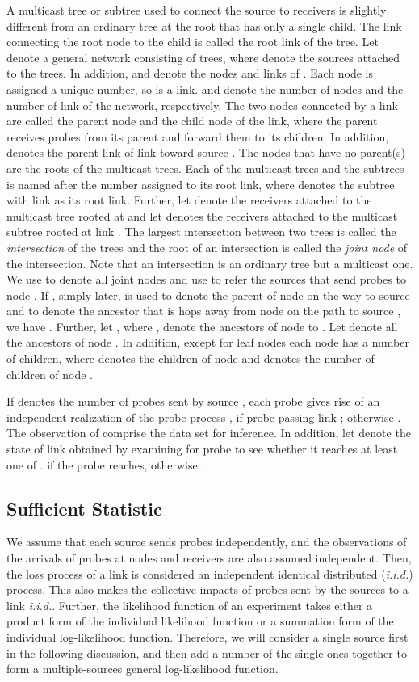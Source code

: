 \documentclass[10pt,twocolumn]{IEEEtran}
\begin{document}
A multicast tree or subtree used to connect the source to receivers is
slightly different from an ordinary tree at
 the root  that has only a single child. The link connecting the root node to the child is called the root link of the
 tree. Let  denote a general
network consisting of  trees, where  denote the sources attached to the trees. In addition,  and
 denote the nodes and links of . Each node is assigned a
unique number, so is a link.  and  denote the number of
nodes and the number of link of the network, respectively. The two
nodes connected by a link are called the parent node and the child
node of the link, where the parent receives probes from its parent and
forward them to its children. In addition,  denotes the
parent link of link  toward source . The nodes that have no
parent(s) are the roots of the multicast trees. Each of the multicast
trees and the subtrees is named after the number assigned to its root
link, where  denotes the subtree with link  as its
root link. Further, let  denote the receivers attached
to the multicast tree rooted at  and let  denotes
the receivers attached to the multicast subtree rooted at link .
The largest intersection between two trees is called the {\it
intersection} of the trees and the root of an intersection is called
the {\it joint node} of the intersection. Note that an intersection is
an ordinary tree but a multicast one. We use  to denote all joint
nodes and use  to refer the sources that
send probes to node . If , simply  later, is used
to denote the parent of node  on the way to source  and
 to denote the ancestor that is  hops away from node 
on the path to source , we have .
Further, let , where
, denote the ancestors of node  to . Let
 denote all the ancestors of node . In
addition, except for leaf nodes each node has a number of children,
where  denotes the children of node  and  denotes the
number of children of node .

 If  denotes the
number of probes sent by source , each probe  gives
rise of an independent realization  of the probe process ,
 if probe  passing link ; otherwise
. The observation of  comprise the data set for
inference. In addition, let  denote the state of link  obtained by examining  for
probe  to see whether it reaches at least one of .
 if the probe reaches, otherwise .
\subsection{Sufficient Statistic}

We assume that each source sends probes independently, and the
observations of the arrivals of probes at nodes and receivers are also
assumed independent. Then, the loss process of a link is considered an
independent identical distributed ({\it i.i.d.}) process. This also
makes the collective impacts of probes sent by the sources to a link
{\it i.i.d.}. Further, the likelihood function of an experiment takes
either a product form of the individual likelihood function or a
summation form of the individual log-likelihood function. Therefore,
we will consider a single source first in the following discussion,
and then add a number of the single ones together to form a
multiple-sources general log-likelihood function.
\end{document}
